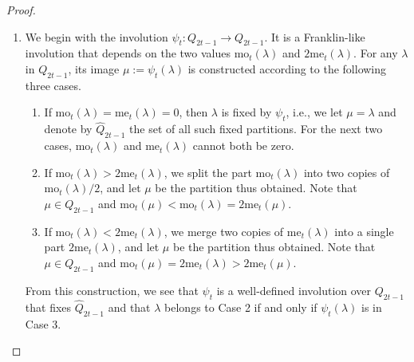 \documentclass[12pt,reqno]{amsart}
\numberwithin{equation}{section}
\def\mo{\mathrm{mo}}
\def\me{\mathrm{me}}
\begin{document}
\begin{proof}
	
	\begin{enumerate}
		\item[\textbf{Step 1:}] We begin with the involution $\psi_{t}\colon Q_{2t-1} \to Q_{2t-1}$. It is a Franklin-like involution that depends on the two values $\mo_t(\lambda)$ and $2\me_t(\lambda)$. For any $\lambda$ in $Q_{2t-1}$, its image $\mu:=\psi_t(\lambda)$ is constructed according to the following three cases.
		\begin{enumerate}
			\item[Case 1.] If $\mo_t(\lambda)=\me_t(\lambda)=0$, then $\lambda$ is fixed by $\psi_t$, i.e., we let $\mu=\lambda$ and denote by $\hat{Q}_{2t-1}$ the set of all such fixed partitions. For the next two cases, $\mo_t(\lambda)$ and $\me_t(\lambda)$ cannot both be zero.

			\item[Case 2.] If $\mo_t(\lambda)> 2\me_t(\lambda)$, we split the part $\mo_t(\lambda)$ into two copies of $\mo_t(\lambda)/2$, and let $\mu$ be the partition thus obtained. Note that $\mu\in Q_{2t-1}$ and $\mo_t(\mu)<\mo_t(\lambda)=2\me_t(\mu)$.
			
			\item[Case 3.] If $\mo_t(\lambda) <2\me_t(\lambda)$, we merge two copies of $\me_t(\lambda)$ into a single part $2\me_t(\lambda)$, and let $\mu$ be the partition thus obtained. Note that $\mu\in Q_{2t-1}$ and $\mo_t(\mu)=2\me_t(\lambda)>2\me_t(\mu)$.
		\end{enumerate}

	From this construction, we see that $\psi_{t}$ is a well-defined involution over $Q_{2t-1}$ that fixes $\hat{Q}_{2t-1}$ and that $\lambda$ belongs to Case 2 if and only if $\psi_t(\lambda)$ is in Case 3. 
		

\end{enumerate}
\end{proof}
\end{document}
